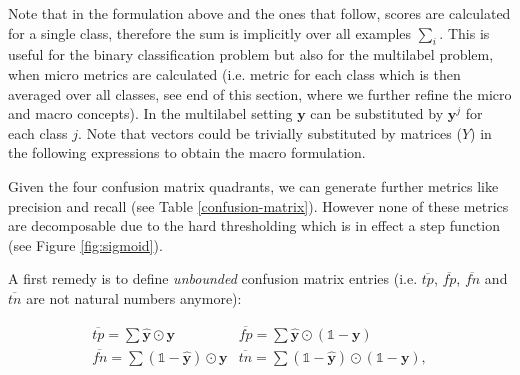 Note that in the formulation above and the ones that follow, scores are calculated for a single class, therefore the sum is implicitly over all examples \(\sum_i\). This is useful for the binary classification problem but also for the multilabel problem, when micro metrics are calculated (i.e. metric for each class which is then averaged over all classes, see end of this section, where we further refine the micro and macro concepts). In the multilabel setting $\mathbf{y}$ can be substituted by $\mathbf{y}^j$ for each class $j$. Note that vectors could be trivially substituted by matrices ($Y$) in the following expressions to obtain the macro formulation.


Given the four confusion matrix quadrants, we can generate further metrics like precision and recall (see Table \ref{confusion-matrix}).  However none of these metrics are decomposable due to the hard thresholding which is in effect a step function (see Figure \ref{fig:sigmoid}).

A first remedy is to define \emph{unbounded} confusion matrix entries 
 (i.e. \(\overline{tp}\), \(\overline{fp}\), \(\overline{fn}\) and  \(\overline{tn}\) are not natural numbers anymore):

\begin{equation}
\label{eq:unbounded}
\begin{array}{ll} \overline{tp} = \sum \hat{\mathbf{y}} \odot \mathbf{y}  & \overline{fp} = \sum \hat{\mathbf{y}} \odot (\mathds{1} - \mathbf{y}) \\ \overline{fn} = \sum (\mathds{1} - \hat{\mathbf{y}}) \odot \mathbf{y} & \overline{tn} = \sum (\mathds{1} - \hat{\mathbf{y}}) \odot (\mathds{1} - \mathbf{y}),
\end{array}
\end{equation}

